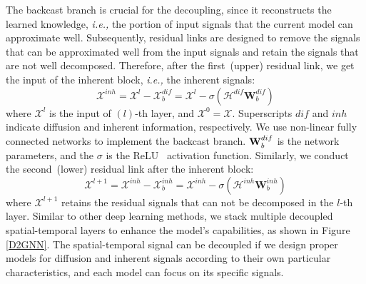 \documentclass[sigconf, nonacm]{acmart}
\def\b#1{\mathbf{#1}}
\def\cal#1{\mathcal{#1}}
\newcommand{\ie}{\textit{i.e.,}\xspace}
\begin{document}
{\color{black}The backcast branch is crucial for the decoupling, since it reconstructs the learned knowledge,} \ie the portion of input signals that the current model can approximate well.
{\color{black}
Subsequently, residual links are designed to remove the signals that can be approximated well from the input signals and retain the signals that are not well decomposed.
Therefore, after the first~(upper) residual link, we get the input of the {\color{black}inherent} block, \ie the {\color{black}inherent} signals:
\begin{equation}
\mathcal{X}^{\mathit{inh}}=\mathcal{X}^{l}-\mathcal{X}_b^{dif}=\mathcal{X}^{l}-\sigma(\cal{H}^{dif}\b{W}_{b}^{dif})
   \label{backcast:tem}
\end{equation}
where $\mathcal{X}^{l}$ is the input of $(l)$-th layer, and $\mathcal{X}^{0}=\mathcal{X}$.}
Superscripts {\color{black}$\mathit{dif}$ and $\mathit{inh}$} indicate {\color{black}diffusion and inherent} information, respectively.
We use non-linear fully connected networks to implement the backcast branch. $\b{W}_{b}^{\color{black}{dif}}$ is the network parameters, and the $\sigma$ is the ReLU~\cite{ReLU} activation function. 
{\color{black}
Similarly, we conduct the second~(lower) residual link after the {\color{black}inherent} block:
\begin{equation}
   \mathcal{X}^{\mathit{l+1}}=\mathcal{X}^{inh}-\mathcal{X}_b^{inh}=\mathcal{X}^{inh}-\sigma(\cal{H}^{inh}\b{W}_{b}^{inh})
   \label{backcast:next}
\end{equation}
where $\mathcal{X}^{l+1}$ retains the residual signals that can not be decomposed in the $l$-th layer. 
Similar to other deep learning methods, we stack multiple decoupled spatial-temporal layers to enhance the model's capabilities, as shown in Figure \ref{D2GNN}.}
The spatial-temporal signal can be decoupled if we design proper models for {\color{black}diffusion and inherent} signals according to their own particular characteristics, and each model can focus on its specific signals.
\end{document}
